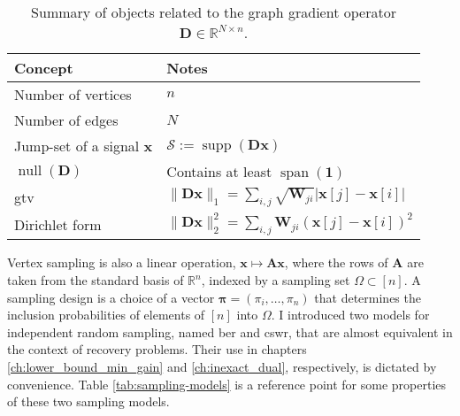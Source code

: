 \begin{table}[H]
    \begin{center}
        \begin{tabular}{ l l }
            \hline\noalign{\smallskip}
            Concept & Notes \\[.1cm]
            \hline\noalign{\smallskip}
            Number of vertices & $n$ \\[.25cm]
            Number of edges & $N$ \\[.25cm]
            Jump-set of a signal $\mathbf{x}$ & $\mathcal{S} := \operatorname{supp}\left ( \mathbf{Dx} \right )$ \\[.25cm]
            $\operatorname{null} \left ( \mathbf{D} \right )$ & Contains at least $\operatorname{span}(\mathbf{1})$ \\[.25cm]
            \acrfull{gtv} & $\| \mathbf{Dx} \|_1 = \sum_{i,j} \sqrt{\mathbf{W}_{ji}} \left | \mathbf{x}[j] - \mathbf{x}[i] \right |$\\[.25cm]
            Dirichlet form & $\| \mathbf{Dx} \|_2^2 = \sum_{i,j} \mathbf{W}_{ji} \left ( \mathbf{x}[j] - \mathbf{x}[i] \right )^2$\\[.1cm]
            \hline
        \end{tabular}
    \end{center}
    \caption[Summary of objects related to the graph gradient operator]{Summary of objects related to the graph gradient operator $\mathbf{D} \in \mathbb{R}^{N \times n}$.}
    \label{tab:concepts-graph-gradient}
\end{table}

Vertex sampling is also a linear operation, $\mathbf{x} \mapsto \mathbf{Ax}$, where the rows of $\mathbf{A}$ are taken from the standard basis of $\mathbb{R}^{n}$, indexed by a sampling set $\Omega \subset [n]$. A sampling design is a choice of a vector $\bm{\pi} = (\pi_i, \dots, \pi_n)$ that determines the inclusion probabilities of elements of $[n]$ into $\Omega$. I introduced two models for independent random sampling, named \acrshort{ber} and \acrshort{cswr}, that are almost equivalent in the context of recovery problems. Their use in chapters \ref{ch:lower_bound_min_gain} and \ref{ch:inexact_dual}, respectively, is dictated by convenience. Table \ref{tab:sampling-models} is a reference point for some properties of these two sampling models.

